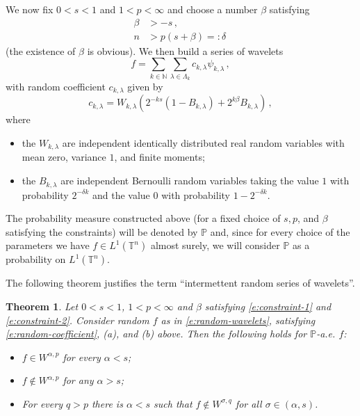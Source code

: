 \documentclass[11pt,reqno]{amsart}
\newtheorem{theorem}{Theorem}[section]
\theoremstyle{definition}
\numberwithin{equation}{section}
\begin{document}
We now fix $0<s <1$ and $1<p<\infty$ and choose a number $\beta$ satisfying
\begin{align}
\beta & > - s\, ,  \label{e:constraint-1}\\
n & > p \left(s+\beta\right) =: \delta\, \label{e:constraint-2}
\end{align}
(the existence of $\beta$ is obvious).
We then build a series of wavelets
\begin{equation}\label{e:random-wavelets}
f = \sum_{k\in \mathbb N} \sum_{\lambda \in \Lambda_k} c_{k, \lambda} \psi_{k, \lambda} \, ,
\end{equation}
with random coefficient $c_{k,\lambda}$ given by
\begin{equation}\label{e:random-coefficient}
c_{k, \lambda} = W_{k, \lambda} \left( 2^{-ks} (1- B_{k, \lambda}) + 2^{k\beta} B_{k, \lambda}\right)\, ,
\end{equation}
where 
\begin{itemize}
\item[(a)] the $W_{k, \lambda}$ are independent identically distributed real random variables with mean zero, variance $1$, and finite moments;
\item[(b)] the $B_{k, \lambda}$ are independent Bernoulli random variables taking the value $1$ with probability $2^{-\delta k}$ and the value $0$ with probability $1-2^{-\delta k}$.
\end{itemize}
The probability measure constructed above (for a fixed choice of $s, p$, and $\beta$ satisfying 
the constraints) will be denoted by $\mathbb P$ and, since for every choice of the parameters we have $f\in L^1 (\mathbb T^n)$ almost surely, we will consider $\mathbb P$ as a probability on $L^1 (\mathbb T^n)$.

The following  theorem justifies the term ``intermettent random series of wavelets''. 

\begin{theorem}\label{t:random-Sobolev}
Let $0< s < 1$, $1<p<\infty$ and $\beta$ satisfying \eqref{e:constraint-1} and \eqref{e:constraint-2}. Consider random $f$ as in \eqref{e:random-wavelets}, satisfying \eqref{e:random-coefficient}, (a), and (b) above. 
Then the following holds for $\mathbb P$-a.e. $f$:
\begin{itemize}
\item[(i)] $f\in W^{\alpha,p}$ for every $\alpha< s$;
\item[(ii)] $f\not\in W^{\alpha,p}$ for any $\alpha > s$;
\item[(iii)] For every $q>p$ there is $\alpha < s$ such that $f\not\in W^{\sigma, q}$ for all $\sigma \in (\alpha, s)$.
\end{itemize}
\end{theorem}
\end{document}
